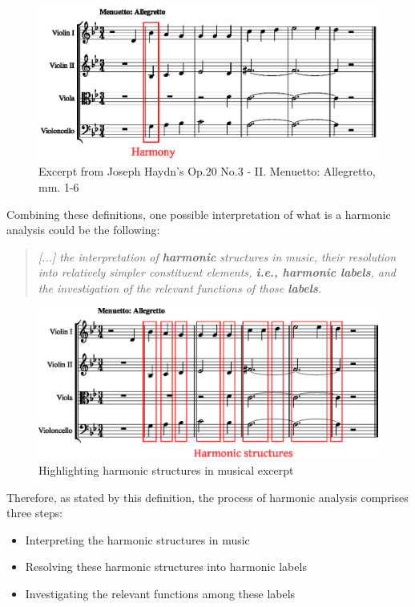 \begin{figure}[h]
  \caption{Excerpt from Joseph Haydn's Op.20 No.3 - II. Menuetto: Allegretto, mm. 1-6}
  \label{fig:harmony}
  \centering
    \includegraphics[width=1.0\textwidth]{01-introduction/figures/1}
\end{figure}

Combining these definitions, one possible interpretation of what is a harmonic analysis could be the following:

\begin{quote}
\centering
\emph{[...] the interpretation of \textbf{harmonic} structures in music,
their resolution into relatively simpler constituent elements, \textbf{i.e., harmonic labels}, and the investigation of the relevant functions of those \textbf{labels}.}
\end{quote}

\begin{figure}[h]
  \caption{Highlighting harmonic structures in musical excerpt}
  \label{fig:harmonic-structures}
  \centering
    \includegraphics[width=1.0\textwidth]{01-introduction/figures/2}
\end{figure}

Therefore, as stated by this definition, the process of harmonic analysis comprises three steps:

\begin{itemize}
  \item Interpreting the harmonic structures in music
  \item Resolving these harmonic structures into harmonic labels
  \item Investigating the relevant functions among these labels
\end{itemize}

